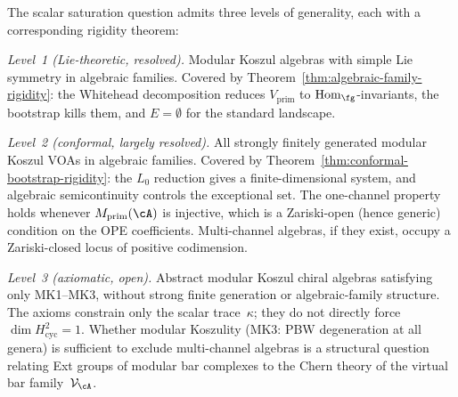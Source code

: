 \begin{remark}
\label{rem:narrowed-universality-scope}
The scalar saturation question admits three levels of generality,
each with a corresponding rigidity theorem:

\smallskip
\emph{Level~1 \textup{(}Lie-theoretic, resolved\textup{)}.}
Modular Koszul algebras with simple Lie symmetry in algebraic
families.  Covered by
Theorem~\ref{thm:algebraic-family-rigidity}: the Whitehead
decomposition reduces $V_{\mathrm{prim}}$ to
$\operatorname{Hom}_\fg$-invariants, the bootstrap kills
them, and $E = \emptyset$ for the standard landscape.

\smallskip
\emph{Level~2 \textup{(}conformal, largely resolved\textup{)}.}
All strongly finitely generated modular Koszul VOAs in algebraic
families.  Covered by
Theorem~\ref{thm:conformal-bootstrap-rigidity}: the $L_0$
reduction gives a finite-dimensional system, and algebraic
semicontinuity controls the exceptional set.  The one-channel
property holds whenever $M_{\mathrm{prim}}(\cA)$ is injective,
which is a Zariski-open (hence generic) condition on the OPE
coefficients.  Multi-channel algebras, if they exist, occupy a
Zariski-closed locus of positive codimension.

\smallskip
\emph{Level~3 \textup{(}axiomatic, open\textup{)}.}
Abstract modular Koszul chiral algebras satisfying only
MK1--MK3, without strong finite generation or algebraic-family
structure.  The axioms constrain only the scalar
trace~$\kappa$; they do not directly force
$\dim H^2_{\mathrm{cyc}} = 1$.  Whether modular Koszulity
(MK3: PBW degeneration at all genera) is sufficient to exclude
multi-channel algebras is a structural question relating Ext
groups of modular bar complexes to the Chern theory of the
virtual bar family~$\mathcal{V}_\cA$.
\end{remark}

